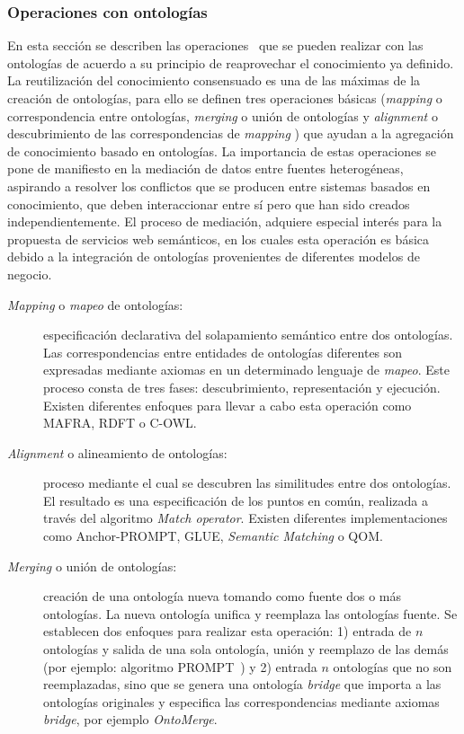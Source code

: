 \subsubsection{Operaciones con ontologías}\label{op-ontologias}
En esta sección se describen las
operaciones~\cite{bruijn06-seman-web} que se pueden
realizar con las ontologías de acuerdo a su principio de reaprovechar el
conocimiento ya definido. La reutilización del conocimiento consensuado  es una de las
máximas de la creación de ontologías, para ello se definen tres operaciones
básicas (\textit{mapping} o correspondencia entre ontologías, \textit{merging} o
unión de ontologías y \textit{alignment} o descubrimiento de las
correspondencias de \textit{mapping} ) que
ayudan a la agregación de conocimiento basado en ontologías. La
importancia de estas operaciones se pone de manifiesto en la mediación de datos
entre fuentes heterogéneas, aspirando a resolver los conflictos que se producen
entre sistemas basados en conocimiento, que deben interaccionar entre sí pero que
han sido creados independientemente. El proceso de mediación, adquiere especial
interés para la propuesta de servicios web semánticos, en los cuales esta
operación es básica debido a la integración de ontologías provenientes de
diferentes modelos de negocio.  


\begin{description}
\item[\textit{Mapping} o \textit{mapeo} de ontologías:] especificación declarativa del
solapamiento semántico entre dos ontologías. Las correspondencias entre
entidades de ontologías diferentes son expresadas mediante axiomas en un
determinado lenguaje de \textit{mapeo}. Este proceso consta de tres fases: descubrimiento, representación y ejecución. Existen diferentes enfoques para llevar a cabo esta operación
como MAFRA, RDFT o C-OWL.
\item[\textit{Alignment} o alineamiento de ontologías:] proceso mediante el cual
se descubren las similitudes entre dos ontologías. El resultado es una especificación de los puntos en común, realizada a través del algoritmo 
\textit{Match operator}. Existen diferentes implementaciones como
Anchor-PROMPT, \linebreak GLUE, \textit{Semantic Matching} o QOM.
\item[\textit{Merging} o unión de ontologías:] creación de una ontología nueva
tomando como fuente dos o más ontologías. La nueva ontología unifica y reemplaza
las ontologías fuente. Se establecen dos enfoques para realizar esta
operación: 1) entrada de $n$ ontologías y salida de una sola
ontología, unión y reemplazo de las demás (por ejemplo: algoritmo
PROMPT~\cite{NM00}) y 2) entrada $n$ ontologías que no son reemplazadas, sino que se genera una ontología
\textit{bridge} que importa a las ontologías originales y especifica las correspondencias mediante
axiomas \textit{bridge}, por ejemplo \textit{OntoMerge}.
\end{description}

